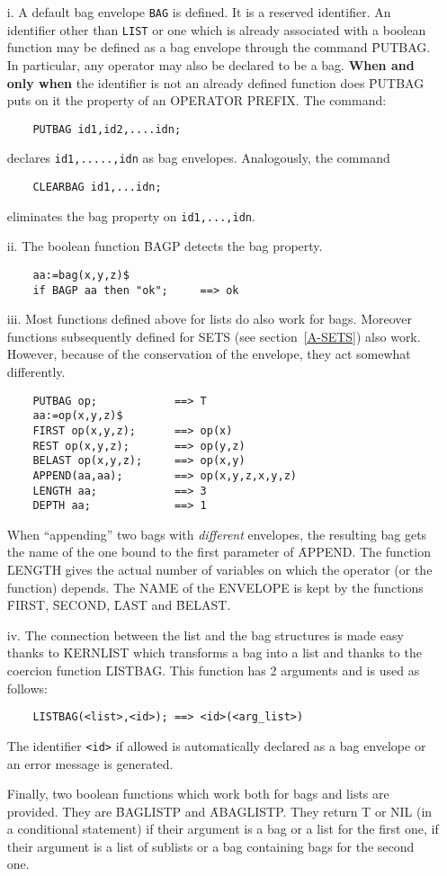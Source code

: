 \begin{itemize}
\item[i.] A default bag envelope \verb+BAG+ is defined.
It is a reserved identifier.
An identifier other than \verb+LIST+ or one which is already associated
with a boolean function may be defined as a bag envelope through the
command \f{PUTBAG}.  In particular, any operator may
also be declared  to be a bag. {\bf When and only when} the identifier
is not an already defined function does \f{PUTBAG} puts on it the
property of an OPERATOR PREFIX.
The command:
\begin{verbatim}
	PUTBAG id1,id2,....idn;
\end{verbatim}
declares \verb+id1,.....,idn+ as bag envelopes.
Analogously, the command
\begin{verbatim}
	CLEARBAG id1,...idn;
\end{verbatim}
eliminates the bag property on \verb+id1,...,idn+.
\item[ii.] The boolean function \f{BAGP} detects the bag
property.
\begin{verbatim}
	aa:=bag(x,y,z)$
	if BAGP aa then "ok";     ==> ok
\end{verbatim}
\item[iii.] Most functions defined above for lists do also work for
bags.
Moreover functions subsequently defined for SETS (see
section~\ref{A-SETS}) also work.
However, because of the conservation of the envelope, they act
somewhat differently.
\begin{verbatim}
	PUTBAG op;            ==> T
	aa:=op(x,y,z)$
	FIRST op(x,y,z);      ==> op(x)
	REST op(x,y,z);       ==> op(y,z)
	BELAST op(x,y,z);     ==> op(x,y)
	APPEND(aa,aa);        ==> op(x,y,z,x,y,z)
	LENGTH aa;            ==> 3
	DEPTH aa;             ==> 1
\end{verbatim}
When ``appending'' two bags with {\em different} envelopes, the
resulting bag gets the name of the one bound to the first parameter of
\f{APPEND}.
The function \f{LENGTH} gives the actual number of variables on which
the operator (or the function) depends.
The NAME of the ENVELOPE is kept by the functions \f{FIRST},
\f{SECOND}, \f{LAST} and \f{BELAST}.
\item[iv.]
The connection between the list and the bag structures is made easy
thanks to \f{KERNLIST} which transforms a bag into a list and thanks to
the coercion function \f{LISTBAG}. This function has
2 arguments and is used as follows:
\begin{verbatim}
	LISTBAG(<list>,<id>); ==> <id>(<arg_list>)
\end{verbatim}
The identifier \verb+<id>+ if allowed is automatically declared as a bag
envelope or an error message is generated.

Finally, two boolean functions which work both for bags and lists are
provided. They are \f{BAGLISTP} and
\f{ABAGLISTP}.
They return T or NIL (in a conditional statement) if their argument
is a bag or a list for the first one, if their argument is a list of
sublists or a bag containing bags for the second one.
\end{itemize}

